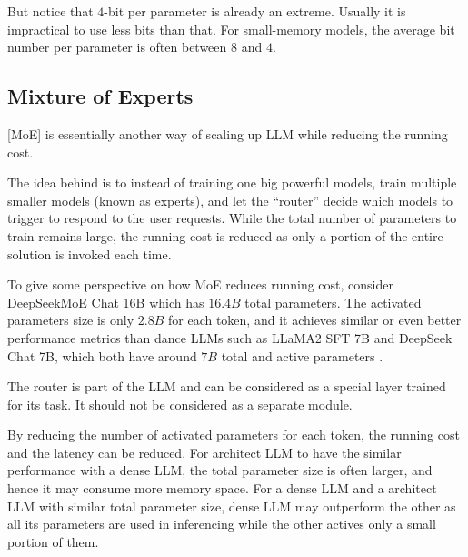 But notice that $4$-bit per parameter is already an extreme. Usually it is impractical to use less bits than that. For small-memory models, the average bit number per parameter is often between $8$ and $4$.

\subsection{Mixture of Experts}

[MoE] is essentially another way of scaling up LLM while reducing the running cost.

The idea behind  is to instead of training one big powerful models, train multiple smaller models (known as experts), and let the ``router'' decide which models to trigger to respond to the user requests. While the total number of parameters to train remains large, the running cost is reduced as only a portion of the entire solution is invoked each time.

To give some perspective on how MoE reduces running cost, consider DeepSeekMoE Chat 16B which has $16.4B$ total parameters. The activated parameters size is only $2.8B$ for each token, and it achieves similar or even better performance metrics than dance LLMs such as LLaMA2 SFT 7B and DeepSeek Chat 7B, which both have around $7B$ total and active parameters \cite{dai2024deepseekmoe}.

The router is part of the LLM and can be considered as a special layer trained for its task. It should not be considered as a separate module.

By reducing the number of activated parameters for each token, the running cost and the latency can be reduced. For  architect LLM to have the similar performance with a dense LLM, the total parameter size is often larger, and hence it may consume more memory space. For a dense LLM and a  architect LLM with similar total parameter size, dense LLM may outperform the other as all its parameters are used in inferencing while the other actives only a small portion of them. 